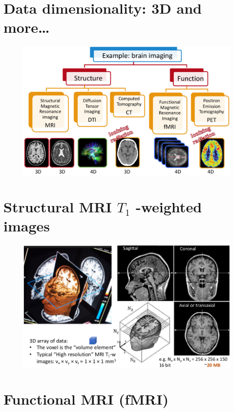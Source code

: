 \section{Data dimensionality: 3D and more…}

\begin{figure}[ht]
	\centering
	\includegraphics[width=0.9\linewidth]{figure_med/data_dim}
\end{figure}
\FloatBarrier

\section{Structural MRI $T_1$ -weighted images}

\begin{figure}[ht]
	\centering
	\includegraphics[width=0.8\linewidth]{figure_med/t1}
\end{figure}
\FloatBarrier

\section{Functional MRI (fMRI)}


